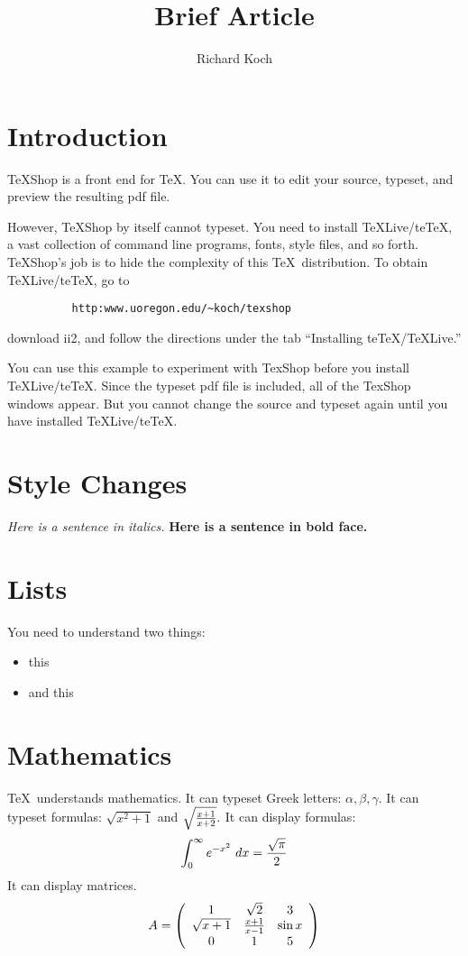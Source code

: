 \documentclass[11pt]{article}
\title{Brief Article}
\author{Richard Koch}
\begin{document}
\maketitle

\section{Introduction}
TeXShop is a front end for \TeX. You can use it to edit your source, typeset, and preview
the resulting pdf file.

However, TeXShop by itself cannot typeset. You need to install TeXLive/teTeX, a vast
collection of command line programs, fonts, style files, and so forth. TeXShop's job is to hide the complexity of
this \TeX\ distribution. To obtain TeXLive/teTeX, go to 
\begin{verbatim}
          http:www.uoregon.edu/~koch/texshop
\end{verbatim}
download ii2, and follow the directions under the tab
``Installing teTeX/TeXLive.''

You can use this example to experiment with TexShop
before you install TeXLive/teTeX. Since the typeset pdf file is included,
all of the TexShop windows appear. But you cannot change the source and
typeset again until you have installed TeXLive/teTeX. 

\section{Style Changes}
{\em Here is a sentence in italics.} 
{\bf Here is a sentence in bold face.} 

\section{Lists}
You need to understand two things:
\begin{itemize}
\item this
\item and this
\end{itemize}  

\section{Mathematics}
\TeX\ understands mathematics. It can typeset
Greek letters: $\alpha, \beta, \gamma.$ It can typeset formulas: $\sqrt{x^2 + 1}$ and 
$\sqrt{ {{x + 1} \over {x + 2}} }.$ It can display formulas:
$$\int_0^\infty e^{- x^2} \ dx = { \sqrt{\pi} \over 2}$$
It can display matrices.
$$A = \left( \begin{array}{ccc} 
	1  &  \sqrt{2} & 3 \\
	\sqrt{x + 1} & {{x + 1} \over {x - 1}} & \sin x \\
	0 & 1 & 5
\end{array} \right)$$
\end{document}
